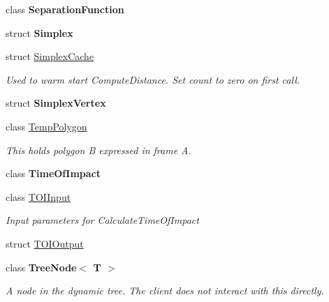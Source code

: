 \begin{DoxyCompactItemize}
class {\bfseries Separation\+Function}
\item 
struct {\bfseries Simplex}
\item 
struct \hyperlink{struct_farseer_physics_1_1_collision_1_1_simplex_cache}{Simplex\+Cache}
\begin{DoxyCompactList}\small\item\em Used to warm start Compute\+Distance. Set count to zero on first call. \end{DoxyCompactList}\item 
struct {\bfseries Simplex\+Vertex}
\item 
class \hyperlink{class_farseer_physics_1_1_collision_1_1_temp_polygon}{Temp\+Polygon}
\begin{DoxyCompactList}\small\item\em This holds polygon B expressed in frame A. \end{DoxyCompactList}\item 
class {\bfseries Time\+Of\+Impact}
\item 
class \hyperlink{class_farseer_physics_1_1_collision_1_1_t_o_i_input}{T\+O\+I\+Input}
\begin{DoxyCompactList}\small\item\em Input parameters for Calculate\+Time\+Of\+Impact \end{DoxyCompactList}\item 
struct \hyperlink{struct_farseer_physics_1_1_collision_1_1_t_o_i_output}{T\+O\+I\+Output}
\item 
class {\bfseries Tree\+Node$<$ T $>$}
\begin{DoxyCompactList}\small\item\em A node in the dynamic tree. The client does not interact with this directly. \end{DoxyCompactList}\end{DoxyCompactItemize}
